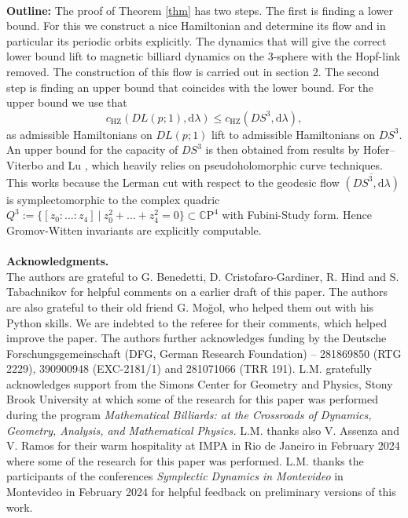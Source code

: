 \documentclass[12pt]{article}
\newcommand{\cp}{\mathbb{C}\mathrm{P}}
\newcommand{\hz}{\mathrm{HZ}}
\newcommand{\dd}{\mathrm{d}}
\begin{document}
\ \\
\noindent
\textbf{Outline:}
The proof of Theorem \ref{thm} has two steps. The first is finding a lower bound. For this we construct a nice Hamiltonian and determine its flow and in particular its periodic orbits explicitly. The dynamics that will give the correct lower bound lift to magnetic billiard dynamics on the 3-sphere with the Hopf-link removed. The construction of this flow is carried out in section 2. The second step is finding an upper bound that coincides with the lower bound. For the upper bound we use that
$$
c_{\hz}(DL(p;1),\dd\lambda)\leq c_{\hz}(DS^3,\dd\lambda),
$$
as admissible Hamiltonians on $DL(p;1)$ lift to admissible Hamiltonians on $DS^3$. An upper bound for the capacity of $DS^3$ is then obtained from results by Hofer--Viterbo \cite{HV92} and Lu \cite{Lu06}, which heavily relies on pseudoholomorphic curve techniques. This works because the Lerman cut \cite{ler} with respect to the geodesic flow $\overline{(DS^3,\dd\lambda)}$ is symplectomorphic to the complex quadric $Q^3:=\lbrace [z_0:\ldots:z_4]\ \vert\ z_0^2+\ldots + z_4^2=0\rbrace\subset \cp^4$ with Fubini-Study form. Hence Gromov-Witten invariants are explicitly computable.\\
\ \\
\noindent
\textbf{Acknowledgments.}\\
The authors are grateful to G. Benedetti, D. Cristofaro-Gardiner, R. Hind and S. Tabachnikov for helpful comments on a earlier draft of this paper. The authors are also grateful to their old friend G. Mo\u gol, who helped them out with his Python skills. We are indebted to the referee for their comments, which helped improve the paper. The authors further acknowledges funding by the Deutsche Forschungsgemeinschaft (DFG, German Research Foundation) – 281869850 (RTG 2229), 390900948 (EXC-2181/1) and 281071066 (TRR 191). L.M. gratefully acknowledges support from the Simons Center for Geometry and Physics, Stony Brook
University at which some of the research for this paper was performed during the program
\textit{Mathematical Billiards: at the Crossroads of Dynamics, Geometry, Analysis, and Mathematical Physics.} L.M. thanks also V. Assenza and V. Ramos for their warm hospitality at IMPA in Rio de Janeiro in February 2024 where some of the research for this paper was performed.  L.M. thanks the participants of the conferences \textit{Symplectic Dynamics in Montevideo} in Montevideo in February 2024 for helpful feedback on preliminary versions of this work.\\
\end{document}
